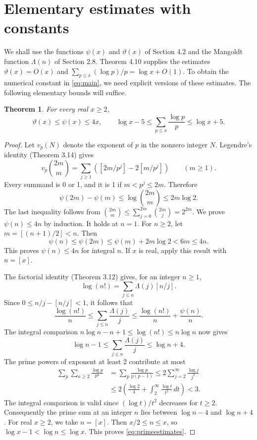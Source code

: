 \documentclass[11pt,twoside,leqno]{article}
\theoremstyle{apostol}
\newtheorem{theorem}{Theorem}
\newcommand{\dd}{\,dt}
\newcommand{\fl}[1]{\left[#1\right]}
\begin{document}
\section{Elementary estimates with constants}
\label{sec:estimates}

We shall use the functions \(\psi(x)\) and \(\vartheta(x)\) of Section
4.2 and the Mangoldt function \(\Lambda(n)\) of Section 2.8.
Theorem 4.10 supplies the estimates
\(\vartheta(x)=O(x)\) and
\(\sum_{p\le x}(\log p)/p=\log x+O(1)\).
To obtain the numerical constant in \eqref{eq:main}, we need explicit
versions of these estimates. The following elementary bounds will suffice.

\begin{theorem}\label{thm:primeestimates}
For every real \(x\ge2\),
\begin{equation}\label{eq:primeestimates}
 \vartheta(x)\le\psi(x)\le4x,\qquad
 \log x-5\le\sum_{p\le x}\frac{\log p}{p}\le\log x+5.
\end{equation}
\end{theorem}

\begin{proof}
Let \(v_p(N)\) denote the exponent of \(p\) in the nonzero integer \(N\).
Legendre's identity (Theorem 3.14) gives
\[
 v_p\binom{2m}{m}
 =\sum_{j\ge1}\left(\fl{2m/p^j}-2\fl{m/p^j}\right)
 \qquad(m\ge1).
\]
Every summand is 0 or 1, and it is 1 if \(m<p^j\le2m\). Therefore
\[
 \psi(2m)-\psi(m)\le\log\binom{2m}{m}\le2m\log2.
\]
The last inequality follows from
\(\binom{2m}{m}\le\sum_{j=0}^{2m}\binom{2m}j=2^{2m}\).
We prove \(\psi(n)\le4n\) by induction. It holds at \(n=1\).
For \(n\ge2\), let \(m=\fl{(n+1)/2}<n\). Then
\[
 \psi(n)\le\psi(2m)\le\psi(m)+2m\log2<6m\le4n.
\]
This proves \(\psi(n)\le4n\) for integral \(n\). If \(x\) is real, apply
this result with \(n=\fl x\).

The factorial identity (Theorem 3.12) gives, for an integer \(n\ge1\),
\[
 \log(n!)=\sum_{j\le n}\Lambda(j)\fl{n/j}.
\]
Since \(0\le n/j-\fl{n/j}<1\), it follows that
\[
 \frac{\log(n!)}n\le\sum_{j\le n}\frac{\Lambda(j)}j
 \le\frac{\log(n!)}n+\frac{\psi(n)}n.
\]
The integral comparison
\(n\log n-n+1\le\log(n!)\le n\log n\) now gives
\[
 \log n-1\le\sum_{j\le n}\frac{\Lambda(j)}j\le\log n+4.
\]
The prime powers of exponent at least 2 contribute at most
\begin{align*}
 \sum_p\sum_{a\ge2}\frac{\log p}{p^a}
 &=\sum_p\frac{\log p}{p(p-1)}
 \le2\sum_{j=2}^{\infty}\frac{\log j}{j^2}\\
 &\le2\left(\frac{\log2}{4}
       +\int_2^\infty\frac{\log t}{t^2}\dd\right)<3.
\end{align*}
The integral comparison is valid since \((\log t)/t^2\) decreases
for \(t\ge2\). Consequently the prime sum at an integer \(n\) lies
between \(\log n-4\) and \(\log n+4\). For real \(x\ge2\), we take
\(n=\fl x\). Then \(x/2\le n\le x\), so
\(\log x-1<\log n\le\log x\). This proves
\eqref{eq:primeestimates}.
\end{proof}
\end{document}
